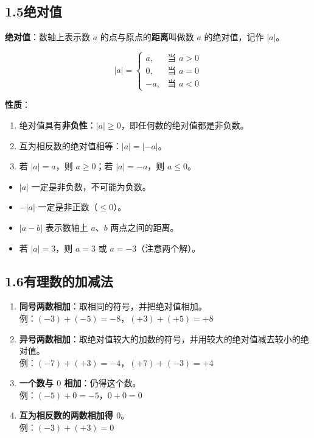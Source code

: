 \documentclass[12pt, a4paper]{ctexart}
\begin{document}
\subsection*{1.5\quad 绝对值}

\begin{knowledgebox}[绝对值的定义]
\textbf{绝对值}：数轴上表示数 $a$ 的点与原点的\textbf{距离}叫做数 $a$ 的绝对值，记作 $|a|$。

\[
|a| = \begin{cases} a, & \text{当 } a > 0 \\ 0, & \text{当 } a = 0 \\ -a, & \text{当 } a < 0 \end{cases}
\]

\textbf{性质}：
\begin{enumerate}[leftmargin=*]
  \item 绝对值具有\textbf{非负性}：$|a| \geqslant 0$，即任何数的绝对值都是非负数。
  \item 互为相反数的绝对值相等：$|a| = |-a|$。
  \item 若 $|a| = a$，则 $a \geqslant 0$；若 $|a| = -a$，则 $a \leqslant 0$。
\end{enumerate}
\end{knowledgebox}

\begin{warnbox}[易错提醒]
\begin{itemize}[leftmargin=*]
  \item $|a|$ 一定是非负数，不可能为负数。
  \item $-|a|$ 一定是非正数（$\leqslant 0$）。
  \item $|a - b|$ 表示数轴上 $a$、$b$ 两点之间的距离。
  \item 若 $|a| = 3$，则 $a = 3$ 或 $a = -3$（注意两个解）。
\end{itemize}
\end{warnbox}

\subsection*{1.6\quad 有理数的加减法}

\begin{knowledgebox}[有理数加法法则]
\begin{enumerate}[leftmargin=*]
  \item \textbf{同号两数相加}：取相同的符号，并把绝对值相加。\\
  例：$(-3) + (-5) = -8$，$(+3) + (+5) = +8$
  \item \textbf{异号两数相加}：取绝对值较大的加数的符号，并用较大的绝对值减去较小的绝对值。\\
  例：$(-7) + (+3) = -4$，$(+7) + (-3) = +4$
  \item \textbf{一个数与 $0$ 相加}：仍得这个数。\\
  例：$(-5) + 0 = -5$，$0 + 0 = 0$
  \item \textbf{互为相反数的两数相加得 $0$}。\\
  例：$(-3) + (+3) = 0$
\end{enumerate}
\end{knowledgebox}
\end{document}
